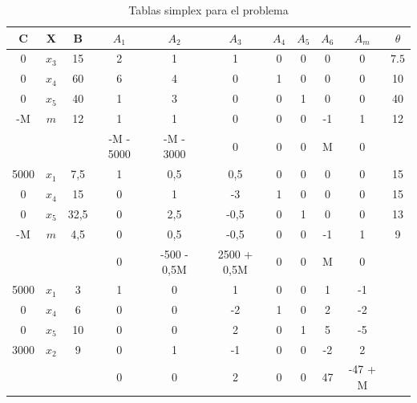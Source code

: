 \documentclass[a4paper,11pt]{article}
\begin{document}
\begin{table}[h!]
\centering
\begin{tabular}{ | c | c | c || c | c | c | c | c | c | c || c | }
  \hline
  C          & X       & B    & \(A_1\)   & \(A_2\)     & \(A_3\)     & \(A_4\) & \(A_5\) & \(A_6\) & \(A_m\) & \(\theta\) \\ \hline
  0          & \(x_3\) & 15   & 2         & 1           & 1           & 0       & 0       & 0       & 0       & \(7.5\) \\ \hline
  0          & \(x_4\) & 60   & 6         & 4           & 0           & 1       & 0       & 0       & 0       & 10 \\ \hline
  0          & \(x_5\) & 40   & 1         & 3           & 0           & 0       & 1       & 0       & 0       & 40 \\ \hline
 -M          & \(m\)   & 12   & 1         & 1           & 0           & 0       & 0       & -1      & 1       & 12 \\ \hline \hline
             &         &      & -M - 5000 & -M - 3000   & 0           & 0       & 0       & M       & 0       & \\ \hline \hline
  5000       & \(x_1\) & 7,5  & 1         & 0,5         & 0,5         & 0       & 0       & 0       & 0       & 15 \\ \hline
     0       & \(x_4\) & 15   & 0         & 1           & -3          & 1       & 0       & 0       & 0       & 15 \\ \hline
     0       & \(x_5\) & 32,5 & 0         & 2,5         & -0,5        & 0       & 1       & 0       & 0       & 13 \\ \hline
    -M       & \(m\)   & 4,5  & 0         & 0,5         & -0,5        & 0       & 0       & -1      & 1       & 9 \\ \hline \hline
             &         &      & 0         & -500 - 0,5M & 2500 + 0,5M & 0       & 0       & M       & 0       & \\ \hline \hline
    5000     & \(x_1\) & 3    & 1         & 0           & 1           & 0       & 0       & 1       & -1      & \\ \hline
       0     & \(x_4\) & 6    & 0         & 0           & -2          & 1       & 0       & 2       & -2      & \\ \hline
        0    & \(x_5\) & 10   & 0         & 0           & 2           & 0       & 1       & 5       & -5      & \\ \hline
      3000   & \(x_2\) & 9    & 0         & 1           & -1          & 0       & 0       & -2      & 2       & \\ \hline \hline
             &         &      & 0         & 0           & 2           & 0       & 0       & 47      & -47 + M & \\ \hline
\end{tabular}
\caption{Tablas simplex para el problema}\label{tab:simplex}
\end{table}
\end{document}
